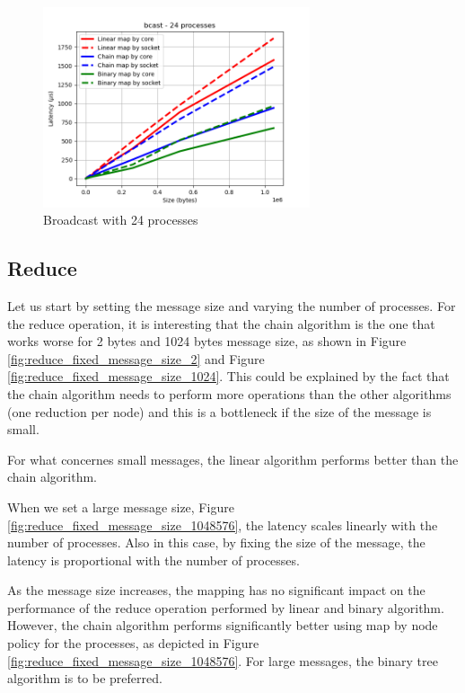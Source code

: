 \begin{figure}[h!]
    \centering
    \includegraphics[width=0.7\textwidth]{../plots/bcast_fixedProcesses24.png}
    \caption{Broadcast with 24 processes}
    \label{fig:broadcast_fixed_processes_24}
\end{figure}

\subsection{Reduce}

Let us start by setting the message size and varying the number of processes. For the reduce operation, it is interesting that the chain algorithm is the one that works worse for 2 bytes and 1024 bytes message size, as shown in Figure \ref{fig:reduce_fixed_message_size_2} and Figure \ref{fig:reduce_fixed_message_size_1024}. 
This could be explained by the fact that the chain algorithm needs to perform more operations than the other algorithms (one reduction per node)
and this is a bottleneck if the size of the message is small.

For what concernes small messages, the linear algorithm performs better than the chain algorithm.

When we set a large message size, Figure \ref{fig:reduce_fixed_message_size_1048576}, the latency scales linearly with the number of processes. Also in this case, by fixing the size of the message, the latency is proportional with the number of processes. 

As the message size increases, the mapping has no significant impact on the performance of the reduce operation performed by linear and binary algorithm. However, the chain algorithm performs significantly better using map by node policy for the processes, as depicted in Figure \ref{fig:reduce_fixed_message_size_1048576}. For large messages, the binary tree algorithm is to be preferred.

